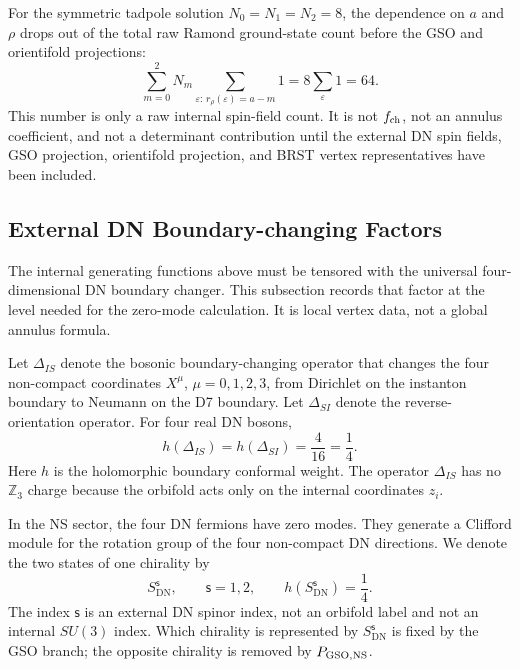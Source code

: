 \documentclass[11pt]{article}
\newcommand{\Z}{\mathbb{Z}}
\newcommand{\NS}{\mathrm{NS}}
\newcommand{\DN}{\mathrm{DN}}
\begin{document}
For the symmetric tadpole solution \(N_0=N_1=N_2=8\), the dependence on \(a\) and \(\rho\) drops
out of the total raw Ramond ground-state count before the GSO and orientifold projections:
\begin{equation}
  \sum_{m=0}^2 N_m
  \sum_{\varepsilon:\,r_\rho(\varepsilon)=a-m}1
  =
  8\sum_{\varepsilon}1
  =
  64.
  \label{eq:symmetric-raw-R-ground-count}
\end{equation}
This number is only a raw internal spin-field count. It is not \(f_{\rm ch}\), not an annulus
coefficient, and not a determinant contribution until the external DN spin fields, GSO
projection, orientifold projection, and BRST vertex representatives have been included.

\subsection{External DN Boundary-changing Factors}

The internal generating functions above must be tensored with the universal four-dimensional DN boundary
changer. This subsection records that factor at the level needed for the zero-mode
calculation. It is local vertex data, not a global annulus formula.

Let \(\Delta_{IS}\) denote the bosonic boundary-changing operator that changes the four
non-compact coordinates \(X^\mu\), \(\mu=0,1,2,3\), from Dirichlet on the instanton boundary to
Neumann on the D7 boundary. Let \(\Delta_{SI}\) denote the reverse-orientation operator. For
four real DN bosons,
\begin{equation}
  h(\Delta_{IS})=h(\Delta_{SI})=\frac{4}{16}=\frac14.
  \label{eq:external-DN-bosonic-twist-weight}
\end{equation}
Here \(h\) is the holomorphic boundary conformal weight. The operator \(\Delta_{IS}\) has no
\(\Z_3\) charge because the orbifold acts only on the internal coordinates \(z_i\).

In the NS sector, the four DN fermions have zero modes. They generate a Clifford module for the
rotation group of the four non-compact DN directions. We denote the two states of one chirality
by
\begin{equation}
  S_{\DN}^{\mathsf s},
  \qquad
  \mathsf s=1,2,
  \qquad
  h(S_{\DN}^{\mathsf s})=\frac14.
  \label{eq:external-DN-NS-spin-fields}
\end{equation}
The index \(\mathsf s\) is an external DN spinor index, not an orbifold label and not an
internal \(SU(3)\) index. Which chirality is represented by \(S_{\DN}^{\mathsf s}\) is fixed by
the GSO branch; the opposite chirality is removed by \(P_{{\rm GSO},\NS}\).
\end{document}
